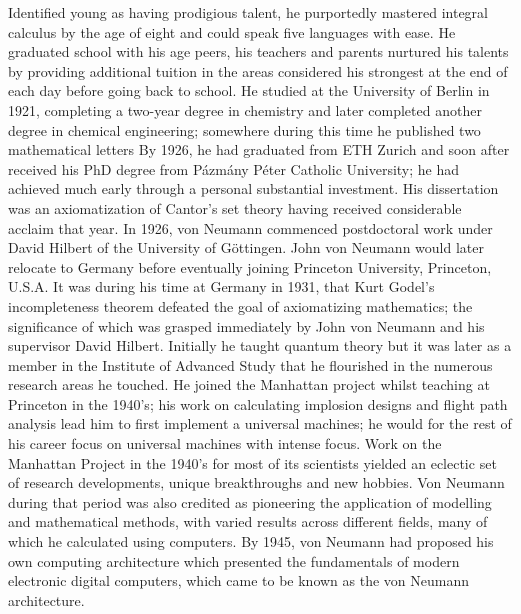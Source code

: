 \documentclass[7pt]{article}
\begin{document}
Identified young as having prodigious talent, he purportedly mastered integral calculus by the age of eight and could speak five languages with ease. He graduated school with his age peers, his teachers and parents nurtured his talents by providing additional tuition in the areas considered his strongest at the end of each day before going back to school. He studied at the University of Berlin in 1921, completing a two-year degree in chemistry and later completed another degree in chemical engineering; somewhere during this time he published two mathematical letters  By 1926, he had graduated from ETH Zurich and soon after received his PhD degree from Pázmány Péter Catholic University; he had achieved much early through a personal substantial investment. His dissertation was an axiomatization of Cantor's set theory having received considerable acclaim that year. In 1926, von Neumann commenced postdoctoral work under David Hilbert of the University of Göttingen. John von Neumann  would later relocate to Germany before eventually joining Princeton University, Princeton, U.S.A. It was during his time at Germany in 1931, that Kurt Godel's incompleteness theorem defeated the goal of axiomatizing mathematics; the significance of which was grasped immediately by John von Neumann and his supervisor David Hilbert. Initially he taught quantum theory but it was later as a member in the Institute of Advanced Study  that  he flourished in the numerous research areas he touched. He joined the Manhattan project whilst teaching at Princeton in the 1940's; his work on calculating implosion designs and flight path analysis lead him to first implement a universal machines; he would for the rest of his career focus on universal machines with intense focus. Work on the Manhattan Project in the 1940's for most of its scientists yielded an eclectic set of research developments, unique breakthroughs and new hobbies. Von Neumann during that period was also credited as pioneering the application of modelling and mathematical methods, with varied results across different fields, many of which he calculated using computers. By 1945, von Neumann had proposed his own computing architecture which presented the fundamentals of modern electronic digital computers, which came to be known as the von Neumann architecture.
\end{document}

